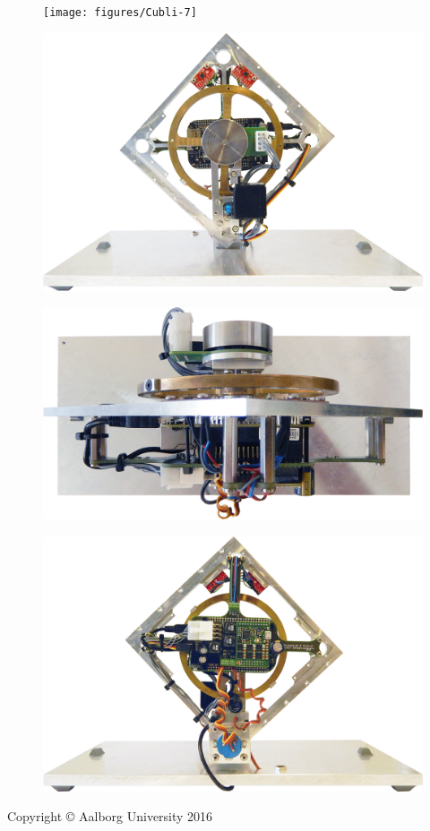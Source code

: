 \small
\begin{figure}[H] 
	\centering
	\texttt{[image: figures/Cubli-7]}
\end{figure}
\begin{figure}[H] 
	\centering
	\includegraphics[scale=0.4]{figures/Cubli-2}
\end{figure}
\begin{figure}[H] 
	\centering
	\includegraphics[scale=0.3, angle=180]{figures/Cubli-3}
\end{figure}
\begin{figure}[H] 
	\centering
	\includegraphics[scale=0.4, angle=180]{figures/Cubli-1}
\end{figure}
\strut\vfill %
\noindent Copyright \copyright{} Aalborg University 2016\par
\vspace{0.2cm}

